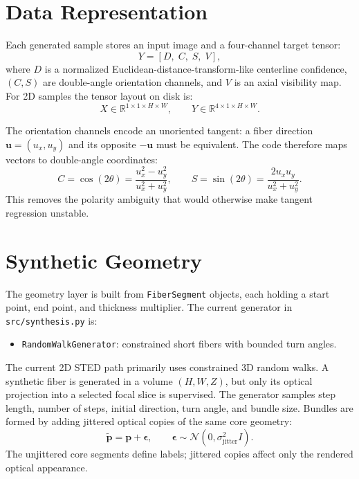 \documentclass[11pt, a4paper]{article}
\begin{document}
\section{Data Representation}

Each generated sample stores an input image and a four-channel target tensor:
\begin{equation}
    Y = \left[D,\; C,\; S,\; V\right],
\end{equation}
where $D$ is a normalized Euclidean-distance-transform-like centerline confidence,
$(C,S)$ are double-angle orientation channels, and $V$ is an axial visibility map.
For 2D samples the tensor layout on disk is:
\begin{equation}
    X \in \mathbb{R}^{1 \times 1 \times H \times W},
    \qquad
    Y \in \mathbb{R}^{4 \times 1 \times H \times W}.
\end{equation}

The orientation channels encode an unoriented tangent: a fiber direction
$\bm{u} = (u_x, u_y)$ and its opposite $-\bm{u}$ must be equivalent. The code
therefore maps vectors to double-angle coordinates:
\begin{equation}
    C = \cos(2\theta) = \frac{u_x^2 - u_y^2}{u_x^2 + u_y^2},
    \qquad
    S = \sin(2\theta) = \frac{2u_xu_y}{u_x^2 + u_y^2}.
\end{equation}
This removes the polarity ambiguity that would otherwise make tangent regression
unstable.

\section{Synthetic Geometry}

The geometry layer is built from \texttt{FiberSegment} objects, each holding a
start point, end point, and thickness multiplier. The current generator in
\texttt{src/synthesis.py} is:
\begin{itemize}
    \item \texttt{RandomWalkGenerator}: constrained short fibers with bounded turn angles.
\end{itemize}

The current 2D STED path primarily uses constrained 3D random walks. A synthetic
fiber is generated in a volume $(H,W,Z)$, but only its optical projection into a
selected focal slice is supervised. The generator samples step length, number of
steps, initial direction, turn angle, and bundle size. Bundles are formed by
adding jittered optical copies of the same core geometry:
\begin{equation}
    \tilde{\bm{p}} = \bm{p} + \bm{\epsilon}, \qquad
    \bm{\epsilon} \sim \mathcal{N}(0, \sigma_{\text{jitter}}^2 I).
\end{equation}
The unjittered core segments define labels; jittered copies affect only the
rendered optical appearance.
\end{document}
